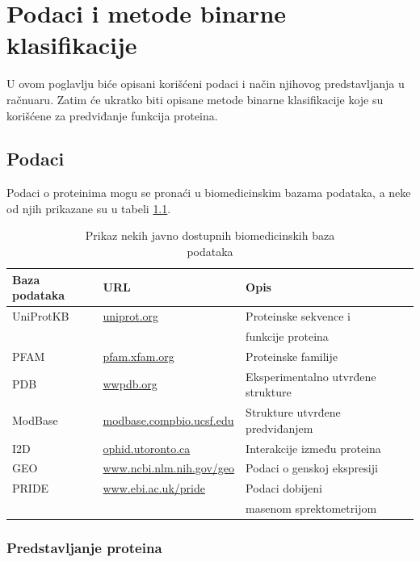 \chapter{Podaci i metode binarne klasifikacije} %
\label{Chapter3}

U ovom poglavlju biće opisani korišćeni podaci i način njihovog predstavljanja u račnuaru. Zatim će ukratko biti opisane metode binarne klasifikacije koje su korišćene za predviđanje funkcija proteina.


\section{Podaci}

Podaci o proteinima mogu se pronaći u biomedicinskim bazama podataka, a neke od njih prikazane su u tabeli \ref{tab: databases}. 

\begin{table}[H]
	\centering
	\begin{tabular}{|l|l|l|}
		\hline
		Baza podataka & URL & Opis \\
		\hline
		UniProtKB & \url{uniprot.org} & Proteinske sekvence i \\ & & funkcije proteina \\
		\hline
		PFAM & \url{pfam.xfam.org} & Proteinske familije \\
		\hline
		PDB & \url{wwpdb.org} & Eksperimentalno utvrđene strukture \\
		\hline
		ModBase & \url{modbase.compbio.ucsf.edu} & Strukture utvrđene predviđanjem \\
		\hline
		I2D & \url{ophid.utoronto.ca} & Interakcije između proteina \\
		\hline
		GEO & \url{www.ncbi.nlm.nih.gov/geo} & Podaci o genskoj ekspresiji \\
		\hline
		PRIDE & \url{www.ebi.ac.uk/pride} & Podaci dobijeni \\
		& & masenom sprektometrijom \\
		\hline 
	\end{tabular}
	\caption{Prikaz nekih javno dostupnih biomedicinskih baza \\ podataka \cite{radivojac, doktJK}}
	\label{tab: databases}
\end{table}



\subsection{Predstavljanje proteina}

